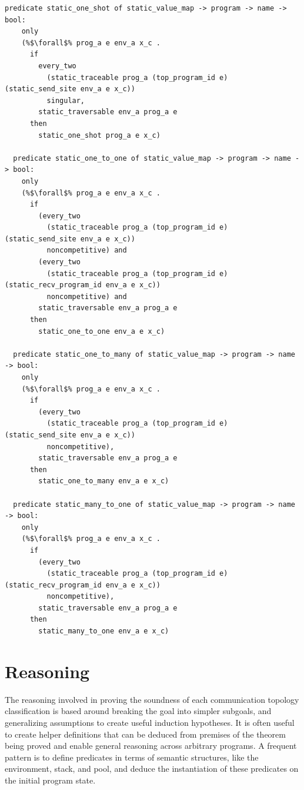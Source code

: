 \documentclass{article}
\begin{document}
\begin{lstlisting}[language=logic, escapechar=\%]
  predicate static_one_shot of static_value_map -> program -> name -> bool:
    only
    (%$\forall$% prog_a e env_a x_c .
      if
        every_two
          (static_traceable prog_a (top_program_id e) (static_send_site env_a e x_c))
          singular,
        static_traversable env_a prog_a e
      then
        static_one_shot prog_a e x_c)

  predicate static_one_to_one of static_value_map -> program -> name -> bool:
    only
    (%$\forall$% prog_a e env_a x_c .
      if
        (every_two
          (static_traceable prog_a (top_program_id e) (static_send_site env_a e x_c))
          noncompetitive) and 
        (every_two
          (static_traceable prog_a (top_program_id e) (static_recv_program_id env_a e x_c))
          noncompetitive) and 
        static_traversable env_a prog_a e
      then
        static_one_to_one env_a e x_c)

  predicate static_one_to_many of static_value_map -> program -> name -> bool:
    only
    (%$\forall$% prog_a e env_a x_c .
      if
        (every_two
          (static_traceable prog_a (top_program_id e) (static_send_site env_a e x_c))
          noncompetitive),
        static_traversable env_a prog_a e
      then
        static_one_to_many env_a e x_c) 

  predicate static_many_to_one of static_value_map -> program -> name -> bool:
    only
    (%$\forall$% prog_a e env_a x_c .
      if
        (every_two
          (static_traceable prog_a (top_program_id e) (static_recv_program_id env_a e x_c))
          noncompetitive),
        static_traversable env_a prog_a e
      then
        static_many_to_one env_a e x_c) 
\end{lstlisting}

\section{Reasoning}
The reasoning involved in proving the soundness of each communication topology classification
is based around breaking the goal into simpler subgoals, and generalizing assumptions to create
useful induction hypotheses.  It is often useful to
create helper definitions that can be deduced
from premises of the theorem being proved and enable
general reasoning across arbitrary programs.
A frequent pattern is to define
predicates in terms of semantic structures, like the environment, stack, and pool, and deduce 
the instantiation of these predicates on the initial program state. 
\end{document}
